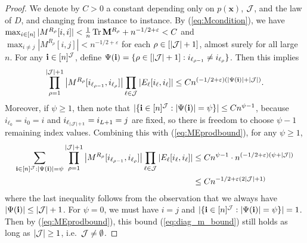 \documentclass[10pt,reqno]{amsart}
\def\bi{\mathbf{i}}
\def\bx{\mathbf{x}}
\def\eps{\varepsilon}
\def\Tr{\operatorname{Tr}}
\begin{document}
\begin{proof}
We denote by $C>0$ a constant depending only on $p(\bx)$,
$\mathcal{J}$, and the law of $D$, and changing from instance to instance.
By (\ref{eq:Mcondition}), we have
$\max_{i \in [n]} |M^{R_\rho}[i,i]|<\frac{1}{n}\Tr \bM^{R_\rho}+n^{-1/2+\eps}<C$
and $\max_{i \neq j} |M^{R_\rho}[i,j]|<n^{-1/2+\eps}$
for each $\rho \in [|\mathcal{J}|+1]$, almost surely
for all large $n$. For any $\bi\in[n]^\cJ$, define 
$\Psi(\bi)=\{\rho\in[|\cJ|+1]:i_{\ell_{\rho-1}}\neq i_{\ell_{\rho}}\}$. Then
this implies
\begin{equation}\label{eq:MEprodbound}
	\prod_{\rho=1}^{|\cJ|+1} \big|
	M^{R_\rho}[i_{\ell_{\rho-1}},i_{\ell_{\rho}}]\big|
	\prod_{\ell \in\cJ} |E_\ell[i_\ell,i_\ell]| \leq 
	Cn^{(-1/2+\eps)(|\Psi(\bi)|+|\cJ|)}.
\end{equation}
Moreover, if $\psi \geq 1$, then note that $|\{\bi\in[n]^\cJ:|\Psi(\bi)|=\psi\}|
\leq Cn^{\psi-1}$, because $i_{\ell_0}=i_0=i$ and $i_{\ell_{|\mathcal{J}|+1}}=i_{L+1}=j$
are fixed, so there is freedom to choose $\psi-1$ remaining index values.
Combining this with (\ref{eq:MEprodbound}), for any $\psi \geq 1$,
\begin{align}\label{eq:diag_m_bound}
	\sum_{\bi\in[n]^\cJ:|\Psi(\bi)|=\psi}
	\prod_{\rho=1}^{|\cJ|+1} \big|
	M^{R_\rho}[i_{\ell_{\rho-1}},i_{\ell_{\rho}}]\big|
	\prod_{\ell \in\cJ} |E_\ell[i_\ell,i_\ell]| &\leq 
	Cn^{\psi-1} \cdot n^{(-1/2+\eps)(\psi+|\cJ|)}\notag\\
	&\leq Cn^{-1/2+\eps(2|\cJ|+1)}
\end{align}
where the last inequality follows from the observation that we always have 
$|\Psi(\bi)| \leq |\cJ|+1$. For $\psi=0$, we must have $i=j$ and
$|\{\bi\in[n]^\cJ:|\Psi(\bi)|=\psi\}|=1$. Then by (\ref{eq:MEprodbound}),
this bound
(\ref{eq:diag_m_bound}) still holds as long as $|\mathcal{J}| \geq 1$, i.e.\ $\mathcal{J} \neq
\emptyset$.


\end{proof}
\end{document}
